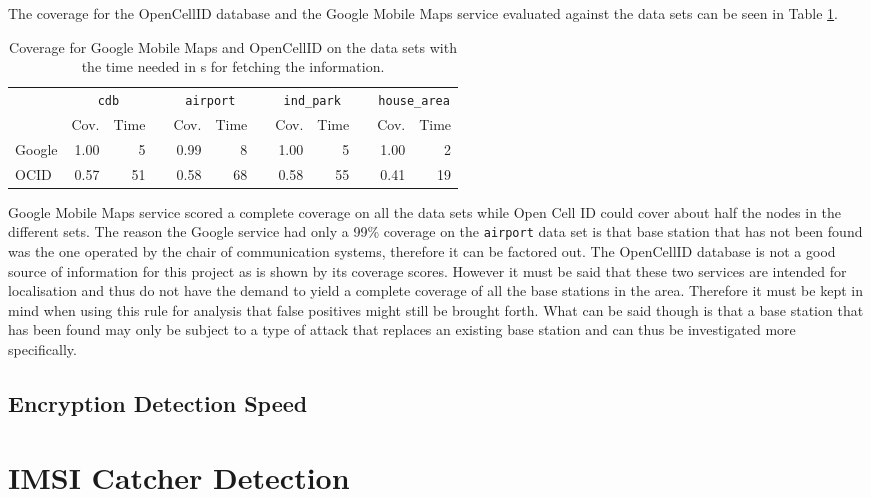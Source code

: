 The coverage for the OpenCellID database and the Google Mobile Maps service evaluated against the data sets can be seen in Table \ref{tab:coverage}.
\begin{table}
\centering
\begin{tabular}{lrrcrrcrrcrr}
\toprule
& \multicolumn{2}{c}{\texttt{cdb}} &\phantom{a}& \multicolumn{2}{c}{\texttt{airport}} &\phantom{a} & \multicolumn{2}{c}{\texttt{ind\_park}}&\phantom{a} & \multicolumn{2}{c}{\texttt{house\_area}}\\
\cmidrule{2-3} \cmidrule{5-6} \cmidrule{8-9} \cmidrule{11-12}
&Cov.&Time&	&Cov.&Time&	&Cov.&Time&	&Cov.&Time\\
\midrule
Google&		1.00&5&	&0.99&8&	&1.00&5&	&1.00&2\\
OCID&		0.57&51&	&0.58&68&	&0.58&55&	&0.41&19\\
\bottomrule
\end{tabular}
\caption{Coverage for Google Mobile Maps and OpenCellID on the data sets with the time needed in s for fetching the information.}
\label{tab:coverage}
\end{table}
Google Mobile Maps service scored a complete coverage on all the data sets while Open Cell ID could cover about half the nodes in the different sets.
The reason the Google service had only a 99\% coverage on the \texttt{airport} data set is that base station that has not been found was the one operated by the chair of communication systems, therefore it can be factored out.
The OpenCellID database is not a good source of information for this project as is shown by its coverage scores.
However it must be said that these two services are intended for localisation and thus do not have the demand to yield a complete coverage of all the base stations in the area.
Therefore it must be kept in mind when using this rule for analysis that false positives might still be brought forth.
What can be said though is that a base station that has been found may only be subject to a type of attack that replaces an existing base station and can thus be investigated more specifically.

\subsection{Encryption Detection Speed}

\section{IMSI Catcher Detection}

